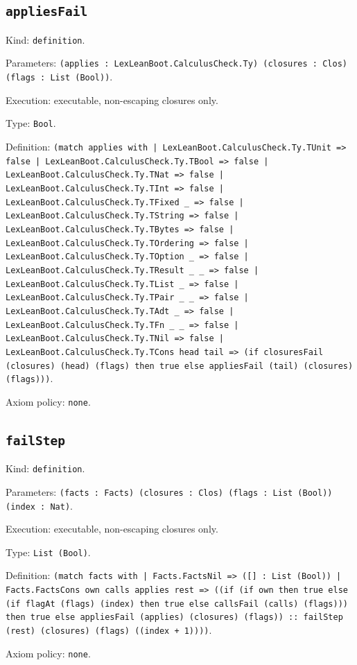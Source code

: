 \documentclass[11pt]{article}
\begin{document}
\subsection*{\texttt{appliesFail}}
\noindent Kind: \texttt{definition}.\par
\noindent Parameters: \texttt{(applies : LexLeanBoot.CalculusCheck.Ty) (closures : Clos) (flags : List (Bool))}.\par
\noindent Execution: executable, non-escaping closures only.\par
\noindent Type: \texttt{Bool}.\par
\noindent Definition: \texttt{(match applies with | LexLeanBoot.CalculusCheck.Ty.TUnit => false | LexLeanBoot.CalculusCheck.Ty.TBool => false | LexLeanBoot.CalculusCheck.Ty.TNat => false | LexLeanBoot.CalculusCheck.Ty.TInt => false | LexLeanBoot.CalculusCheck.Ty.TFixed \_ => false | LexLeanBoot.CalculusCheck.Ty.TString => false | LexLeanBoot.CalculusCheck.Ty.TBytes => false | LexLeanBoot.CalculusCheck.Ty.TOrdering => false | LexLeanBoot.CalculusCheck.Ty.TOption \_ => false | LexLeanBoot.CalculusCheck.Ty.TResult \_ \_ => false | LexLeanBoot.CalculusCheck.Ty.TList \_ => false | LexLeanBoot.CalculusCheck.Ty.TPair \_ \_ => false | LexLeanBoot.CalculusCheck.Ty.TAdt \_ => false | LexLeanBoot.CalculusCheck.Ty.TFn \_ \_ => false | LexLeanBoot.CalculusCheck.Ty.TNil => false | LexLeanBoot.CalculusCheck.Ty.TCons head tail => (if closuresFail (closures) (head) (flags) then true else appliesFail (tail) (closures) (flags)))}.\par
\noindent Axiom policy: \texttt{none}.\par
\subsection*{\texttt{failStep}}
\noindent Kind: \texttt{definition}.\par
\noindent Parameters: \texttt{(facts : Facts) (closures : Clos) (flags : List (Bool)) (index : Nat)}.\par
\noindent Execution: executable, non-escaping closures only.\par
\noindent Type: \texttt{List (Bool)}.\par
\noindent Definition: \texttt{(match facts with | Facts.FactsNil => ([] : List (Bool)) | Facts.FactsCons own calls applies rest => ((if (if own then true else (if flagAt (flags) (index) then true else callsFail (calls) (flags))) then true else appliesFail (applies) (closures) (flags)) :: failStep (rest) (closures) (flags) ((index + 1))))}.\par
\noindent Axiom policy: \texttt{none}.\par
\end{document}
